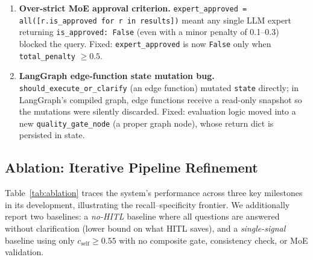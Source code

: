 \documentclass{article}
\begin{document}
\begin{enumerate}
  \item \textbf{Over-strict MoE approval criterion.}
        \texttt{expert\_approved = all([r.is\_approved for r in results])}
        meant any single LLM expert returning \texttt{is\_approved: False}
        (even with a minor penalty of 0.1--0.3) blocked the query.
        Fixed: \texttt{expert\_approved} is now \texttt{False} only when
        \texttt{total\_penalty} $\geq 0.5$.
  \item \textbf{LangGraph edge-function state mutation bug.}
        \texttt{should\_execute\_or\_clarify} (an edge function)
        mutated \texttt{state} directly; in LangGraph's compiled graph,
        edge functions receive a read-only snapshot so the mutations were
        silently discarded.
        Fixed: evaluation logic moved into a new \texttt{quality\_gate\_node}
        (a proper graph node), whose return dict is persisted in state.
\end{enumerate}

\subsection{Ablation: Iterative Pipeline Refinement}
\label{sec:ablation}

Table~\ref{tab:ablation} traces the system's performance across three key
milestones in its development, illustrating the recall--specificity frontier.
We additionally report two baselines: a \emph{no-HITL} baseline where all
questions are answered without clarification (lower bound on what HITL saves),
and a \emph{single-signal} baseline using only $c_{\text{self}} \geq 0.55$
with no composite gate, consistency check, or MoE validation.
\end{document}
